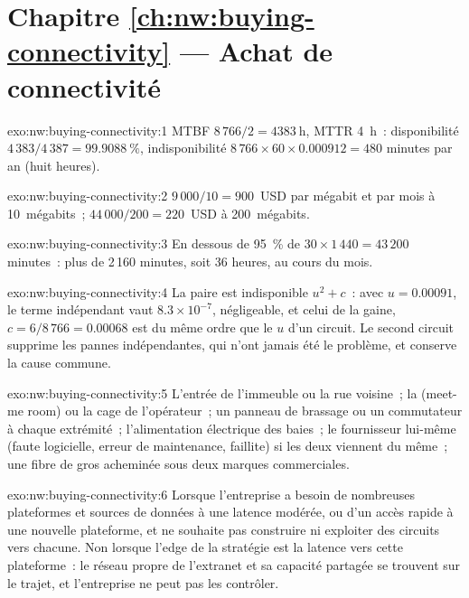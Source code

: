 \section*{Chapitre \ref{ch:nw:buying-connectivity} --- Achat de connectivité}

\begin{solution}{exo:nw:buying-connectivity:1}
MTBF $8\,766/2 = \qty{4383}{\hour}$, MTTR \qty{4}{\hour}~: disponibilité $4\,383/4\,387 = 99.9088~\%$, indisponibilité $8\,766 \times 60 \times 0.000912 = 480$ minutes par
an (huit heures).
\end{solution}

\begin{solution}{exo:nw:buying-connectivity:2}
$9\,000/10 = 900$~USD par mégabit et par mois à 10~mégabits~; $44\,000/200 = 220$~USD à 200~mégabits.
\end{solution}

\begin{solution}{exo:nw:buying-connectivity:3}
En dessous de 95~\% de $30 \times 1\,440 = 43\,200$ minutes~: plus de 2\,160 minutes, soit 36 heures, au cours du mois.
\end{solution}

\begin{solution}{exo:nw:buying-connectivity:4}
La paire est indisponible $u^2 + c$~: avec $u = 0.00091$, le terme indépendant vaut $8.3 \times 10^{-7}$, négligeable, et celui de la gaine, $c = 6/8\,766 = 0.00068$
est du même ordre que le $u$ d'un circuit. Le second circuit supprime les pannes indépendantes, qui n'ont jamais été le problème, et conserve la
cause commune.
\end{solution}

\begin{solution}{exo:nw:buying-connectivity:5}
L'entrée de l'immeuble ou la rue voisine~; la  (meet-me room) ou la cage de l'opérateur~; un panneau de brassage ou un commutateur à chaque extrémité~; l'alimentation électrique des
baies~; le fournisseur lui-même (faute logicielle, erreur de maintenance, faillite) si les deux viennent du même~; une fibre de gros acheminée sous deux marques commerciales.
\end{solution}

\begin{solution}{exo:nw:buying-connectivity:6}
Lorsque l'entreprise a besoin de nombreuses plateformes et sources de données à une latence modérée, ou d'un accès rapide à une nouvelle plateforme, et ne souhaite pas construire ni exploiter
des circuits vers chacune. Non lorsque l'edge de la stratégie est la latence vers cette plateforme~: le réseau propre de l'extranet et sa capacité partagée
se trouvent sur le trajet, et l'entreprise ne peut pas les contrôler.
\end{solution}

